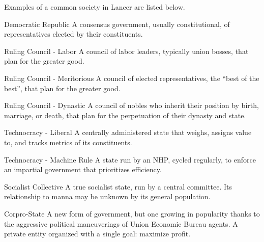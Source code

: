 Examples of a common society in Lancer are listed below.   

 Democratic Republic                                   A consensus government, usually  
                                                       constitutional, of representatives elected by  
                                                       their constituents. 

 Ruling Council - Labor                                A council of labor leaders, typically union  
                                                       bosses, that plan for the greater good.  

 Ruling Council - Meritorious                          A council of elected representatives, the  
                                                       “best of the best”, that plan for the greater  
                                                       good.  

 Ruling Council - Dynastic                             A council of nobles who inherit their position  
                                                       by birth, marriage, or death, that plan for the  
                                                       perpetuation of their dynasty and state.  

 Technocracy - Liberal                                 A centrally administered state that weighs,  
                                                       assigns value to, and tracks metrics of its  
                                                       constituents.  

 Technocracy - Machine Rule                            A state run by an NHP, cycled regularly, to  
                                                       enforce an impartial government that  
                                                       prioritizes efficiency. 

 Socialist Collective                                  A true socialist state, run by a central  
                                                       committee. Its relationship to manna may be  
                                                       unknown by its general population.  

 Corpro-State                                          A new form of government, but one growing  
                                                       in popularity thanks to the aggressive political  
                                                       maneuverings of Union Economic Bureau  
                                                       agents. A private entity organized with a  
                                                       single goal: maximize profit.  

